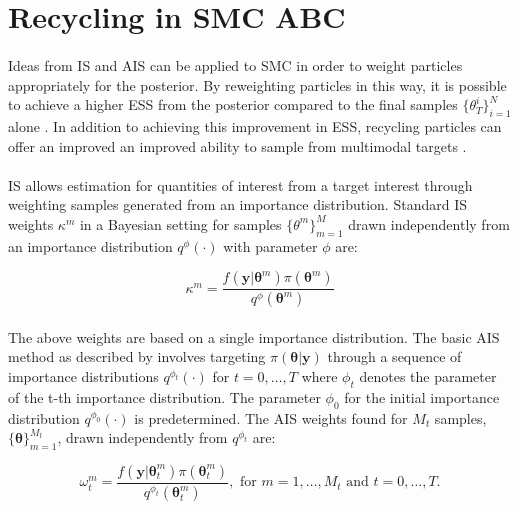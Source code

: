 \documentclass[12,fleqn]{article}
\theoremstyle{definition}
\theoremstyle{plain}
\begin{document}
\section{Recycling in SMC ABC}
\paragraph{}
Ideas from IS and AIS can be applied to SMC in order to weight particles appropriately for the posterior. By reweighting particles in this way, it is possible to achieve a higher ESS from the posterior compared to the final samples $\{ \theta^i_T \}^N_{i=1}$ alone \cite{quteprints101729}. In addition to achieving this improvement in ESS, recycling particles can offer an improved an improved ability to sample from multimodal targets \cite{nguyen2016}. 
\par

\paragraph{}
IS allows estimation for quantities of interest from a target interest through weighting samples generated from an importance distribution. Standard IS weights $\kappa^m$ in a Bayesian setting for samples $\{ \theta^m\}^M_{m=1}$ drawn independently from an importance distribution $q^\phi(\cdot)$ with parameter $\phi$ are:
\par
\begin{equation*}
\kappa^m = \frac{f(\boldsymbol{y}|\boldsymbol{\theta}^m)\pi(\boldsymbol{\theta}^m)}{q^\phi({\boldsymbol{\theta}}^m)}
\end{equation*}

\paragraph{}
The above weights are based on a single importance distribution. The basic AIS method as described by  involves targeting $\pi(\boldsymbol{\theta}|\boldsymbol{y})$ through a sequence of importance distributions $q^{\phi_t}(\cdot)$ for $t = 0, \ldots , T$ where $\phi_t$ denotes the parameter of the t-th importance distribution. The parameter $\phi_0$ for the initial importance  distribution $q^{\phi_0}(\cdot)$ is predetermined. The AIS weights found for $M_t$ samples, $\{\boldsymbol{\theta}\}^{M_t}_{m = 1}$, drawn independently from $q^{\phi_t}$ are:
\par

\begin{equation}
\omega^m_t = \frac{f(\boldsymbol{y} | \boldsymbol{\theta}^m_t) \pi(\boldsymbol{\theta}^m_t)}{q^{\phi_t}(\boldsymbol{\theta}^m_t)} , \text{        for    } m = 1, \ldots , M_t \text{       and        } t = 0, \ldots , T.
\end{equation}
\end{document}
